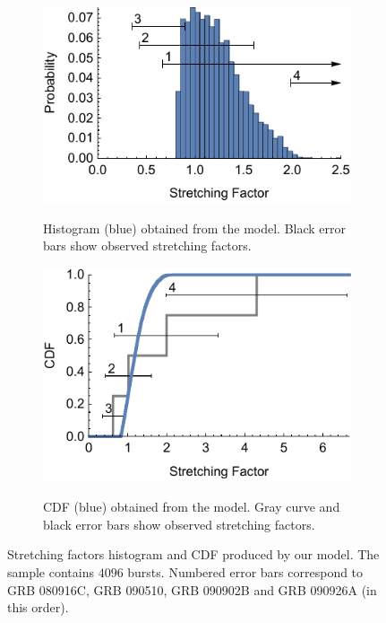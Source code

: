 \documentclass[manuscript]{aastex}
\begin{document}
\begin{figure}
	\hspace*{\fill}
	\begin{subfigure}{0.45\textwidth}
		\includegraphics[width=\textwidth]{kappaDistributionHistogram}
		\label{fig:kappaDistributionHistogram}
		\caption{Histogram (blue) obtained from the model. Black error bars show observed stretching factors.}
	\end{subfigure}
	\hfill
	\begin{subfigure}{0.45\textwidth}
		\includegraphics[width=\textwidth]{kappaDistributionCDF}
		\label{fig:kappaDistributionCDF}
		\caption{CDF (blue) obtained from the model. Gray curve and black error bars show observed stretching factors.}
	\end{subfigure}
	\hspace*{\fill}
	\caption{
		Stretching factors histogram and CDF produced by our model.
		The sample contains $4096$ bursts.
		Numbered error bars correspond to GRB 080916C, GRB 090510, GRB 090902B and GRB 090926A (in this order).
	}
	\label{fig:kappaDistribution}
\end{figure}
\end{document}
